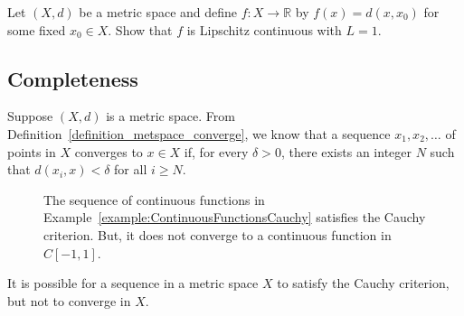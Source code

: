 \begin{problem}
Let $(X,d)$ be a metric space and define $f: X \to \mathbb{R}$ by $f(x)=d(x,x_0)$ for some fixed $x_0 \in X$.
Show that $f$ is Lipschitz continuous with $L=1$.
\end{problem}


\subsection{Completeness}
\label{sec:metspace_complete}
Suppose $(X,d)$ is a metric space.
From Definition~\ref{definition_metspace_converge}, we know that a sequence $x_1, x_2, \ldots$ of points in $X$ converges to $x \in X$ if, for every $\delta >0$, there exists an integer $N$ such that $d(x_i,x)<\delta$ for all $i \geq N$.

\begin{figure}[ht]
\begin{center}
\vspace{-8mm}
\end{center}
\caption{The sequence of continuous functions in Example~\ref{example:ContinuousFunctionsCauchy} satisfies the Cauchy criterion.
But, it does not converge to a continuous function in $C[-1,1]$.}
\end{figure}

It is possible for a sequence in a metric space $X$ to satisfy the Cauchy criterion, but not to converge in $X$.

